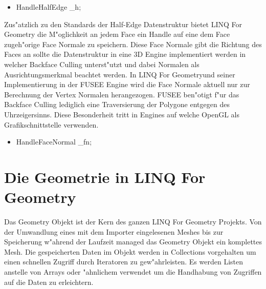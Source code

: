 \documentclass[pagesize, paper=a4, fontsize=12pt,titlepage=true, headings=small, headnosepline, abstractoff, liststotoc, nochapterprefix, plainheadsepline]{scrreprt}
\newcommand{\LFG}{LINQ For Geometry}
\newcommand{\LFGS}{LINQ For Geometry }
\newcommand{\HES}{Half-Edge Datenstruktur }
\begin{document}
\begin{itemize}
\item HandleHalfEdge \_h;
\end{itemize}

Zus"atzlich zu den Standards der \HES bietet \LFGS die M"oglichkeit an jedem Face ein Handle auf eine dem Face zugeh"orige Face Normale zu speichern. Diese Face Normale gibt die Richtung des Faces an sollte die Datenstruktur in eine 3D Engine implementiert werden in welcher Backface Culling unterst"utzt und dabei Normalen als Ausrichtungsmerkmal beachtet werden. In \LFG und seiner Implementierung in der FUSEE Engine wird die Face Normale aktuell nur zur Berechnung der Vertex Normalen herangezogen. FUSEE ben"otigt f"ur das Backface Culling lediglich eine Traversierung der Polygone entgegen des Uhrzeigersinns. Diese Besonderheit tritt in Engines auf welche OpenGL als Grafikschnittstelle verwenden.
\begin{itemize}
\item HandleFaceNormal \_fn;
\end{itemize}
	\section {Die Geometrie in \LFG}
			Das Geometry Objekt ist der Kern des ganzen \LFGS Projekts. Von der Umwandlung eines mit dem Importer eingelesenen Meshes bis zur Speicherung w"ahrend der Laufzeit managed das Geometry Objekt ein komplettes Mesh. Die gespeicherten Daten im Objekt werden in Collections vorgehalten um einen schnellen Zugriff durch Iteratoren zu gew"ahrleisten. Es werden Listen anstelle von Arrays oder "ahnlichem verwendet um die Handhabung von Zugriffen auf die Daten zu erleichtern.
\end{document}
